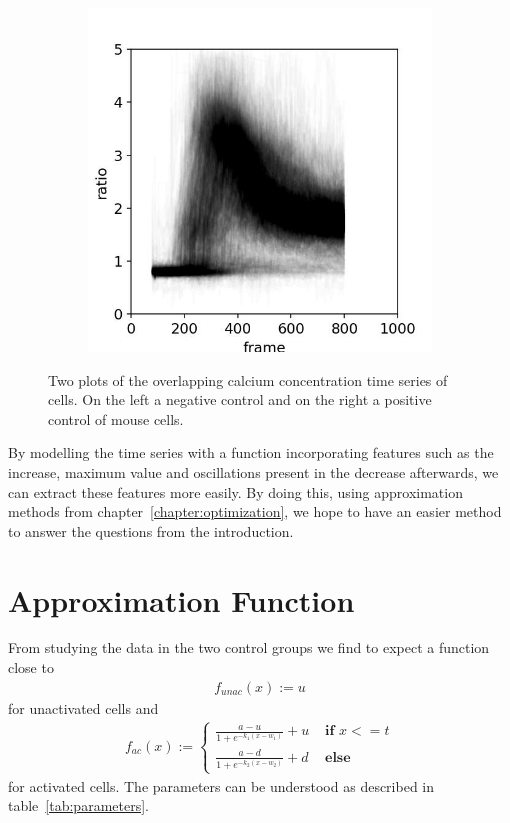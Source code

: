 \begin{figure}[h]
\begin{subfigure}{0.45\linewidth}
		\includegraphics[width=\textwidth]{fig/all_cells_overlayed_mouse_pos}
	\end{subfigure}
	
	\caption{Two plots of the overlapping calcium concentration time series of cells. On the left a negative control and on the right a positive control of mouse cells.}
	\label{fig:all_cells_overlayed}
\end{figure}

By modelling the time series with a function incorporating features such as the increase, maximum value and oscillations present in the decrease afterwards, we can extract these features more easily. By doing this, using approximation methods from chapter~\ref{chapter:optimization}, we hope to have an easier method to answer the questions from the introduction.

\section{Approximation Function}

From studying the data in the two control groups we find to expect a function close to
\begin{align}
	\label{math:function_unactivated_cell}
	f_{unac}(x) := u
\end{align}
for unactivated cells and
\begin{align}
	\label{math:function_activated_cell}
	f_{ac}(x) := \begin{cases}
		\frac{a-u}{1 + e^{-k_1(x-w_1)}} + u & \textbf{ if } x <= t\\
		\frac{a-d}{1 + e^{-k_2(x-w_2)}} + d & \textbf{ else}
	\end{cases}
\end{align}
for activated cells. The parameters can be understood as described in table~\ref{tab:parameters}.

